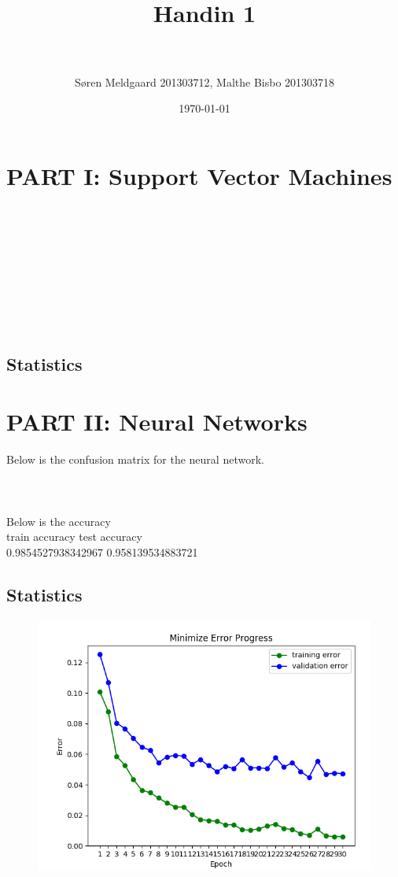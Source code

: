 \documentclass[paper=a4, fontsize=11pt]{scrartcl} %
\title{	
\normalfont \normalsize 
\horrule{0.5pt} \\[0.4cm] %
\huge Handin 1 \\ %
\horrule{2pt} \\[0.5cm] %
}
\author{S\o ren Meldgaard 201303712, Malthe Bisbo 201303718} %
\date{\normalsize\today} %
\numberwithin{equation}{section} %
\numberwithin{figure}{section} %
\numberwithin{table}{section} %
\begin{document}
\maketitle %

\section{PART I: Support Vector Machines}
 \\ \\
 \\ \\
 \\ \\
 \\ \\
\subsection{Statistics}

\section{PART II: Neural Networks}
Below is the confusion matrix for the neural network. \\ \\
 \\ \\
Below is the accuracy \\
train accuracy test accuracy \\                                  
0.9854527938342967   0.958139534883721  \\

\subsection{Statistics}
\begin{figure}[h]
\center
\includegraphics[trim={0 0cm 0 0cm},clip]{../results/nn_256_early_stopping.png}
\end{figure}
\end{document}
